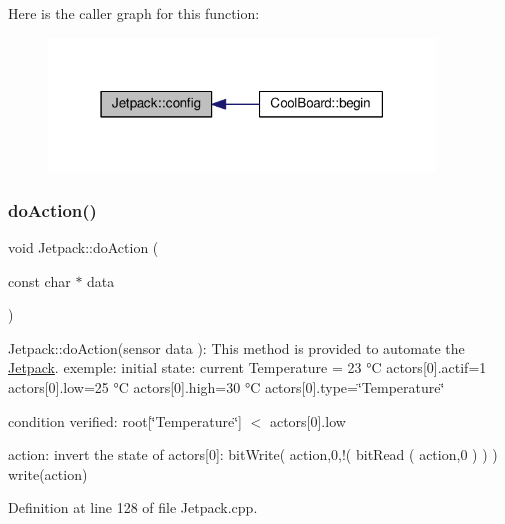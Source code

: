 Here is the caller graph for this function\+:\nopagebreak
\begin{figure}[H]
\begin{center}
\leavevmode
\includegraphics[width=291pt]{df/d1d/class_jetpack_ab065ee83e244265a2223a22f3ee4a719_icgraph}
\end{center}
\end{figure}
\mbox{\label{class_jetpack_a9e703197093094b963f9ad57817495b8}} 
\subsubsection{\texorpdfstring{do\+Action()}{doAction()}}
{\footnotesize\ttfamily void Jetpack\+::do\+Action (\begin{DoxyParamCaption}\item[{const char $\ast$}]{data }\end{DoxyParamCaption})}

Jetpack\+::do\+Action(sensor data )\+: This method is provided to automate the \hyperlink{class_jetpack}{Jetpack}. exemple\+: initial state\+: current Temperature = 23 °C actors\mbox{[}0\mbox{]}.actif=1 actors\mbox{[}0\mbox{]}.low=25 °C actors\mbox{[}0\mbox{]}.high=30 °C actors\mbox{[}0\mbox{]}.type=\char`\"{}\+Temperature\char`\"{}

condition verified\+: root\mbox{[}\char`\"{}\+Temperature\char`\"{}\mbox{]} $<$ actors\mbox{[}0\mbox{]}.low

action\+: invert the state of actors\mbox{[}0\mbox{]}\+: bit\+Write( action,0,!( bit\+Read ( action,0 ) ) ) write(action) 

Definition at line 128 of file Jetpack.\+cpp.


